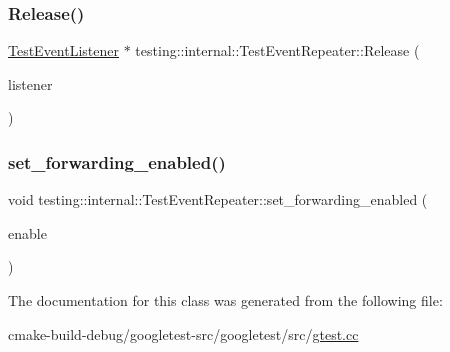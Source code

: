 \subsubsection{\texorpdfstring{Release()}{Release()}}
{\footnotesize\ttfamily \mbox{\hyperlink{classtesting_1_1TestEventListener}{Test\+Event\+Listener}} $\ast$ testing\+::internal\+::\+Test\+Event\+Repeater\+::\+Release (\begin{DoxyParamCaption}\item[{\mbox{\hyperlink{classtesting_1_1TestEventListener}{Test\+Event\+Listener}} $\ast$}]{listener }\end{DoxyParamCaption})}

\mbox{\label{classtesting_1_1internal_1_1TestEventRepeater_a86c52e311b70598a385a0589277e92e0}} 
\subsubsection{\texorpdfstring{set\_forwarding\_enabled()}{set\_forwarding\_enabled()}}
{\footnotesize\ttfamily void testing\+::internal\+::\+Test\+Event\+Repeater\+::set\+\_\+forwarding\+\_\+enabled (\begin{DoxyParamCaption}\item[{bool}]{enable }\end{DoxyParamCaption})\hspace{0.3cm}{\ttfamily [inline]}}



The documentation for this class was generated from the following file\+:\begin{DoxyCompactItemize}
\item 
cmake-\/build-\/debug/googletest-\/src/googletest/src/\mbox{\hyperlink{gtest_8cc}{gtest.\+cc}}\end{DoxyCompactItemize}
